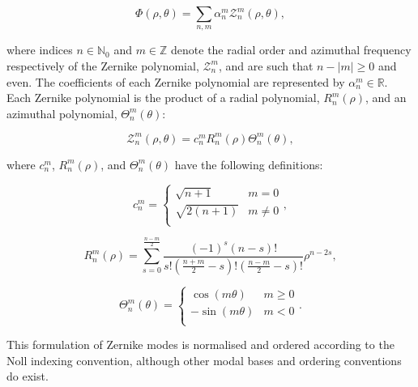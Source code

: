 \begin{equation}\label{eq:phase_zernike_expansion}
\Phi\left(\rho,\theta\right) = \sum\limits_{n,m}\alpha^{m}_{n}\mathcal{Z}^{m}_{n}\left(\rho,\theta\right),
\end{equation}

where indices $n \in \mathbb{N}_{0}$ and $m \in \mathbb{Z}$ denote the radial order 
and azimuthal frequency respectively of the Zernike polynomial, 
$\mathcal{Z}^{m}_{n}$, and are such that $n - \left|m\right| \ge 0$ and even. The
coefficients of each Zernike polynomial are represented by $\alpha^{m}_{n} \in 
\mathbb{R}$. Each Zernike polynomial is the product of a radial polynomial,
$R^{m}_{n}(\rho)$, and an azimuthal polynomial, $\Theta^{m}_{n}(\theta)$:

\begin{equation}\label{eq:zernike_polynomial}
\mathcal{Z}^{m}_{n}\left(\rho,\theta\right) = c^{m}_{n}R^{m}_{n}(\rho)\Theta^{m}_{n}(\theta),
\end{equation}

where $c^{m}_{n}$, $R^{m}_{n}(\rho)$, and $\Theta^{m}_{n}(\theta)$ have the following definitions:

\begin{equation}\label{eq:zernike_polynomial_c}
c^{m}_{n} = 
\begin{cases}
\sqrt{n + 1} & m = 0\\
\sqrt{2(n + 1)} & m \ne 0\\
\end{cases},
\end{equation}

\begin{equation}\label{eq:zernike_polynomial_R}
R^{m}_{n}(\rho) = \sum_{s=0}^{\frac{n-m}{2}}{\frac{(-1)^{s}(n-s)!}{s!\left(\frac{n+m}{2}-s\right)!\left(\frac{n-m}{2}-s\right)!}\rho^{n-2s}},
\end{equation}

\begin{equation}\label{eq:zernike_polynomial_Theta}
\Theta^{m}_{n}(\theta) =
\begin{cases}
\cos(m\theta) & m \ge 0\\
-\sin(m\theta) & m < 0\\
\end{cases}.
\end{equation}

This formulation of Zernike modes is normalised and ordered according
to the Noll indexing convention, although other modal bases and ordering 
conventions do exist\cite{noll1976zernike,thibos2002standards,
	loomis1978computer,soloviev2017optimal,burton1984effects}. 

